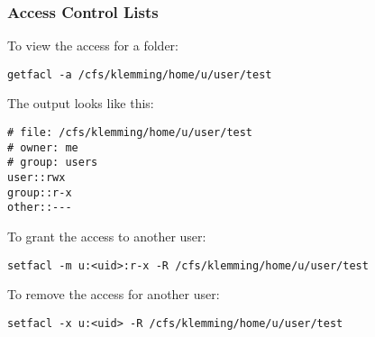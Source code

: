 \begin{frame}[fragile]
\frametitle{Access Control Lists}

\begin{exampleblock}{To view the access for a folder:}
\footnotesize
\begin{verbatim}
getfacl -a /cfs/klemming/home/u/user/test
\end{verbatim}
\end{exampleblock}

\begin{exampleblock}{The output looks like this:}
\footnotesize
\begin{verbatim}
# file: /cfs/klemming/home/u/user/test
# owner: me
# group: users
user::rwx
group::r-x
other::---
\end{verbatim}
\end{exampleblock}

\begin{exampleblock}{To grant the access to another user:}
\footnotesize
\begin{verbatim}
setfacl -m u:<uid>:r-x -R /cfs/klemming/home/u/user/test
\end{verbatim}
\end{exampleblock}

\begin{exampleblock}{To remove the access for another user:}
\footnotesize
\begin{verbatim}
setfacl -x u:<uid> -R /cfs/klemming/home/u/user/test
\end{verbatim}
\end{exampleblock}

\end{frame}



